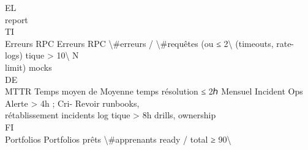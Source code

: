 \documentclass[12pt,landscape,a4paper]{article}
\begin{document}
\vspace{0.5em}
\vspace{0.5em}
\vspace{0.5em}
\vspace{0.5em}
EL\\
report\\
\vspace{0.5em}
\vspace{0.5em}
\vspace{0.5em}
\vspace{0.5em}
TI\\
Erreurs RPC  Erreurs RPC          \textbackslash{}#erreurs / \textbackslash{}#requêtes (ou   ≤ 2\textbackslash{}%
(timeouts, rate-     logs)                                                                 tique \textgreater{} 10\textbackslash{}%
\vspace{0.5em}
\vspace{0.5em}
\vspace{0.5em}
\vspace{0.5em}
N\\
limit)                                                                                                               mocks\\
\vspace{0.5em}
\vspace{0.5em}
\vspace{0.5em}
\vspace{0.5em}
DE\\
MTTR         Temps moyen de       Moyenne temps résolution ≤ 2ℎ   Mensuel          Incident Ops         Alerte \textgreater{} 4h ; Cri-        Revoir runbooks,\\
rétablissement       incidents                                        log                  tique \textgreater{} 8h                drills, ownership\\
\vspace{0.5em}
\vspace{0.5em}
\vspace{0.5em}
\vspace{0.5em}
FI\\
Portfolios   Portfolios prêts     \textbackslash{}#apprenants ready / total ≥ 90\textbackslash{}%
\end{document}
